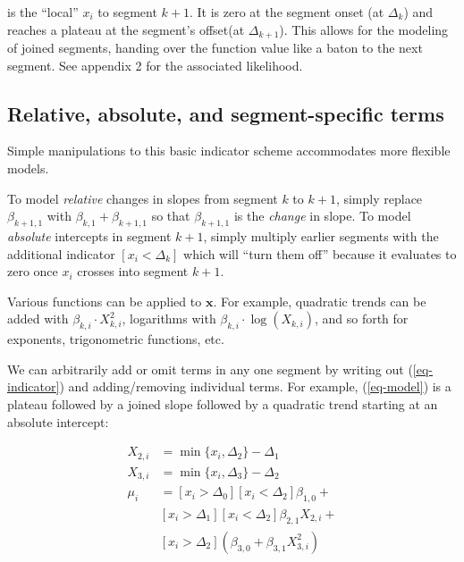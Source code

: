 \documentclass[
  american,
]{article}
\begin{document}
is the ``local'' \(x_i\) to segment \(k + 1\). It is zero at the segment onset (at \(\Delta_k\)) and reaches a plateau at the segment's offset(at \(\Delta_{k+1}\)). This allows for the modeling of joined segments, handing over the function value like a baton to the next segment. See appendix 2 for the associated likelihood.

\hypertarget{relative-absolute-and-segment-specific-terms}{%
\subsection{Relative, absolute, and segment-specific terms}\label{relative-absolute-and-segment-specific-terms}}

Simple manipulations to this basic indicator scheme accommodates more flexible models.

To model \emph{relative} changes in slopes from segment \(k\) to \(k+1\), simply replace \(\beta_{k+1, 1}\) with \(\beta_{k, 1} + \beta_{k + 1, 1}\) so that \(\beta_{k + 1, 1}\) is the \emph{change} in slope. To model \emph{absolute} intercepts in segment \(k + 1\), simply multiply earlier segments with the additional indicator \([x_i < \Delta_k]\) which will ``turn them off'' because it evaluates to zero once \(x_i\) crosses into segment \(k + 1\).

Various functions can be applied to \(\mathbf{x}\). For example, quadratic trends can be added with \(\beta_{k, i} \cdot X_{k,i}^2\), logarithms with \(\beta_{k, i} \cdot \log(X_{k,i})\), and so forth for exponents, trigonometric functions, etc.

We can arbitrarily add or omit terms in any one segment by writing out (\ref{eq-indicator}) and adding/removing individual terms. For example, (\ref{eq-model}) is a plateau followed by a joined slope followed by a quadratic trend starting at an absolute intercept:

\begin{equation}
\label{eq-model}
\begin{aligned}
X_{2, i} & = \min\{x_i, \Delta_2\} - \Delta_1 \\
X_{3, i} & = \min\{x_i, \Delta_3\} - \Delta_2 \\
\mu_i & =  [x_i > \Delta_0] [x_i < \Delta_2] \beta_{1, 0} + \\
         & [x_i > \Delta_1] [x_i < \Delta_2] \beta_{2, 1} X_{2, i} + \\
         & [x_i > \Delta_2] (\beta_{3, 0} + \beta_{3, 1} X_{3, i}^2)
\end{aligned}
\end{equation}
\end{document}
